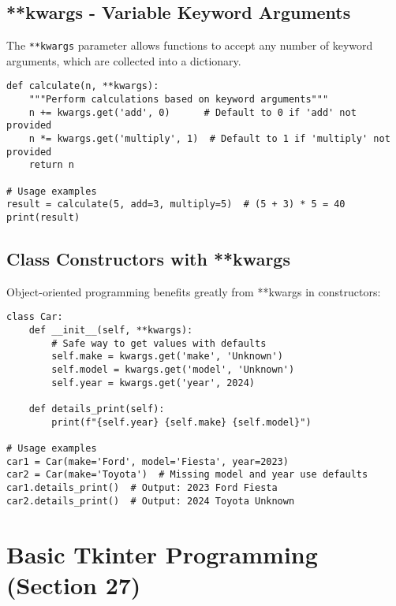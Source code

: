 \documentclass[12pt,a4paper]{article}
\begin{document}
\subsection{**kwargs - Variable Keyword Arguments}

The \texttt{**kwargs} parameter allows functions to accept any number of keyword arguments, which are collected into a dictionary.

\begin{tcolorbox}[colback=green!5!white,colframe=green!75!black,title=**kwargs Example]
\begin{lstlisting}
def calculate(n, **kwargs):
    """Perform calculations based on keyword arguments"""
    n += kwargs.get('add', 0)      # Default to 0 if 'add' not provided
    n *= kwargs.get('multiply', 1)  # Default to 1 if 'multiply' not provided
    return n

# Usage examples
result = calculate(5, add=3, multiply=5)  # (5 + 3) * 5 = 40
print(result)
\end{lstlisting}
\end{tcolorbox}

\subsection{Class Constructors with **kwargs}

Object-oriented programming benefits greatly from **kwargs in constructors:

\begin{tcolorbox}[colback=orange!5!white,colframe=orange!75!black,title=Class with **kwargs]
\begin{lstlisting}
class Car:
    def __init__(self, **kwargs):
        # Safe way to get values with defaults
        self.make = kwargs.get('make', 'Unknown')
        self.model = kwargs.get('model', 'Unknown')
        self.year = kwargs.get('year', 2024)
    
    def details_print(self):
        print(f"{self.year} {self.make} {self.model}")

# Usage examples
car1 = Car(make='Ford', model='Fiesta', year=2023)
car2 = Car(make='Toyota')  # Missing model and year use defaults
car1.details_print()  # Output: 2023 Ford Fiesta
car2.details_print()  # Output: 2024 Toyota Unknown
\end{lstlisting}
\end{tcolorbox}

\section{Basic Tkinter Programming (Section 27)}
\end{document}
